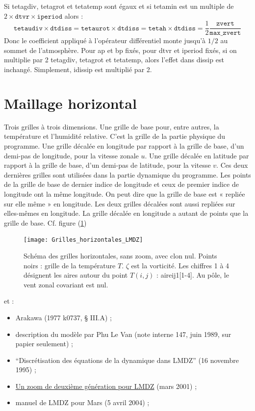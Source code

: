 \documentclass[a4paper,english,french]{article}
\begin{document}
Si tetagdiv, tetagrot et tetatemp sont égaux et si tetamin est un
multiple de $2 \times \mathtt{dtvr} \times \mathtt{iperiod}$ alors :
\begin{equation*}
  \mathtt{tetaudiv} \times \mathtt{dtdiss}
  = \mathtt{tetaurot} \times \mathtt{dtdiss}
  = \mathtt{tetah} \times \mathtt{dtdiss}
  = \frac{1}{2} \frac{\mathtt{zvert}}{\mathtt{max\_zvert}}
\end{equation*}
Donc le coefficient appliqué à l'opérateur différentiel monte jusqu'à
$1 / 2$ au sommet de l'atmosphère. Pour ap et bp fixés, pour dtvr et
iperiod fixés, si on multiplie par 2 tetagdiv, tetagrot et tetatemp,
alors l'effet dans dissip est inchangé. Simplement, idissip est
multiplié par 2.

\section{Maillage horizontal}

Trois grilles à trois dimensions. Une grille de base pour, entre
autres, la température et l'humidité relative. C'est la grille de la
partie physique du programme. Une grille décalée en longitude par
rapport à la grille de base, d'un demi-pas de longitude, pour la
vitesse zonale $u$. Une grille décalée en latitude par rapport à la
grille de base, d'un demi-pas de latitude, pour la vitesse $v$.  Ces
deux dernières grilles sont utilisées dans la partie dynamique du
programme. Les points de la grille de base de dernier indice de
longitude et ceux de premier indice de longitude ont la même
longitude. On peut dire que la grille de base est « repliée sur elle
même » en longitude. Les deux grilles décalées sont aussi repliées sur
elles-mêmes en longitude. La grille décalée en longitude a autant de
points que la grille de base. Cf. figure
(\ref{fig:Grilles_horizontales_LMDZ})
\begin{figure}
  \centering
  \texttt{[image: Grilles\_horizontales\_LMDZ]}
  \caption[Grilles horizontales]{Schéma des grilles horizontales, sans
    zoom, avec clon nul. Points noirs : grille de la température
    $T$. $\zeta$ est la vorticité. Les chiffres 1 à 4 désignent les
    aires autour du point $T(i, j)$ : aireij1[1-4]. Au pôle, le vent
    zonal covariant est nul.}
  \label{fig:Grilles_horizontales_LMDZ}
\end{figure}
et :
\begin{itemize}
\item Arakawa (1977 k0737, § III.A) ;
\item description du modèle par Phu Le Van (note interne 147, juin
  1989, sur papier seulement) ;
\item ``Discrétisation des équations de la dynamique dans LMDZ'' (16
  novembre 1995) ;
\item
  \href{http://lmdz.lmd.jussieu.fr/developpeurs/notes-techniques/ressources/zoom_text.pdf}{Un
    zoom de deuxième génération pour LMDZ} (mars 2001) ;
\item manuel de LMDZ pour Mars (5 avril 2004) ;
\end{itemize}
\end{document}
